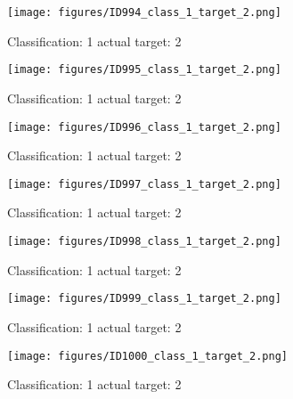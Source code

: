 \begin{figure}[h!]
\begin{center}
\texttt{[image: figures/ID994\_class\_1\_target\_2.png]}
\end{center}
\caption{ Classification: 1 actual target: 2}
\label{fig:ID994_class_1_target_2}
\end{figure}
\begin{figure}[h!]
\begin{center}
\texttt{[image: figures/ID995\_class\_1\_target\_2.png]}
\end{center}
\caption{ Classification: 1 actual target: 2}
\label{fig:ID995_class_1_target_2}
\end{figure}
\begin{figure}[h!]
\begin{center}
\texttt{[image: figures/ID996\_class\_1\_target\_2.png]}
\end{center}
\caption{ Classification: 1 actual target: 2}
\label{fig:ID996_class_1_target_2}
\end{figure}
\begin{figure}[h!]
\begin{center}
\texttt{[image: figures/ID997\_class\_1\_target\_2.png]}
\end{center}
\caption{ Classification: 1 actual target: 2}
\label{fig:ID997_class_1_target_2}
\end{figure}
\begin{figure}[h!]
\begin{center}
\texttt{[image: figures/ID998\_class\_1\_target\_2.png]}
\end{center}
\caption{ Classification: 1 actual target: 2}
\label{fig:ID998_class_1_target_2}
\end{figure}
\begin{figure}[h!]
\begin{center}
\texttt{[image: figures/ID999\_class\_1\_target\_2.png]}
\end{center}
\caption{ Classification: 1 actual target: 2}
\label{fig:ID999_class_1_target_2}
\end{figure}
\begin{figure}[h!]
\begin{center}
\texttt{[image: figures/ID1000\_class\_1\_target\_2.png]}
\end{center}
\caption{ Classification: 1 actual target: 2}
\label{fig:ID1000_class_1_target_2}
\end{figure}
